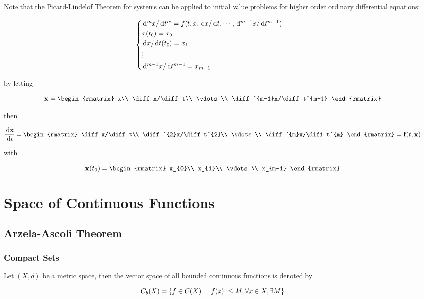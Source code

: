\documentclass[a4paper,12pt]{article}
\begin{document}
Note that the Picard-Lindelof Theorem for systems can be applied to initial value problems for higher order ordinary differential equations:

$$\begin{cases}
  \,\mathrm{d}^{m}x/\,\mathrm{d} t^{m}=f(t,x,\,\mathrm{d} x/\,\mathrm{d} t,\cdots,\,\mathrm{d}^{m-1}x/\,\mathrm{d} t^{m-1})\\
  x(t_{0})=x_{0}\\
  \,\mathrm{d} x/\,\mathrm{d} t(t_{0})=x_{1}\\
  \vdots\\
  \,\mathrm{d}^{m-1}x/\,\mathrm{d} t^{m-1}=x_{m-1}
\end{cases}$$\s

by letting

$$\mathbf{x}=\begin{rmatrix}
  x\\
  \diff x/\diff t\\
  \vdots\\
  \diff^{m-1}x/\diff t^{m-1}
\end{rmatrix}$$\s

then

$$\frac{\diff\mathbf{x}}{\diff t}=\begin{rmatrix}
  \diff x/\diff t\\
  \diff^{2}x/\diff t^{2}\\
  \vdots\\
  \diff^{m}x/\diff t^{m}
\end{rmatrix}=\mathbf{f}(t,\mathbf{x})$$\s

with

$$\mathbf{x}(t_{0})=\begin{rmatrix}
  x_{0}\\
  x_{1}\\
  \vdots\\
  x_{m-1}
\end{rmatrix}$$

\pagebreak

\section{Space of Continuous Functions}
\subsection{Arzela-Ascoli Theorem}
\subsubsection{Compact Sets}
\begin{dft}
  Let $(X,d)$ be a metric space, then the vector space of all bounded continuous functions is denoted by

  $$C_{b}(X)=\left\{ f\in C(X)\,\mid\,\left| f(x)\right|\leq M,\forall x\in X,\exists M\right\}$$
\end{dft}\n
\end{document}
